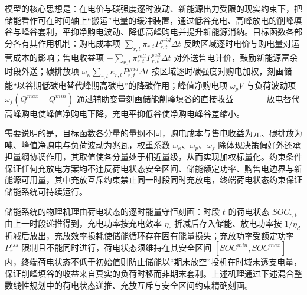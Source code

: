 \documentclass{ctexart}
\begin{document}
模型的核心思想是：在电价与碳强度逐时波动、新能源出力受限的现实约束下，把储能看作可在时间轴上“搬运”电量的缓冲装置，通过低谷充电、高峰放电的削峰填谷与峰谷套利，平抑净购电波动、降低高峰购电并提升新能源消纳。目标函数各部分各有其作用机制：购电成本项 $\sum_{r,t}\pi_{r,t}P^{grid}_{r,t}\Delta t$ 反映区域逐时电价与购电量对运营成本的影响；售电收益项 $-\sum_{r,t}\pi^{sell}_{r,t}P^{sell}_{r,t}\Delta t$ 对外送售电计价，鼓励新能源富余时段外送；碳排放项 $\omega_{\kappa}\sum_{r,t}\kappa_{r,t}P^{grid}_{r,t}\Delta t$ 按区域逐时碳强度对购电加权，刻画储能“以谷期低碳电替代峰期高碳电”的降碳作用；峰值净购电项 $\omega_p V$ 与负荷波动项 $\omega_f(Q^{max}-Q^{min})$ 通过辅助变量刻画储能削峰填谷的直接收益————放电替代高峰购电使峰值净购电下降，充电平抑低谷使净购电峰谷差缩小。

需要说明的是，目标函数各分量的量纲不同，购电成本与售电收益为元、碳排放为吨、峰值净购电与负荷波动为兆瓦，权重系数 $\omega_{\kappa}$、$\omega_p$、$\omega_f$ 除体现决策偏好外还承担量纲协调作用，其取值使各分量处于相近量级，从而实现加权标量化。约束条件保证任何充放电方案均不违反荷电状态安全区间、储能额定功率、购售电边界与新能源可用量，其中充放互斥约束禁止同一时段同时充放电，终端荷电状态约束保证储能系统可持续运行。

储能系统的物理机理由荷电状态的逐时能量守恒刻画：时段 $t$ 的荷电状态 $SOC_{r,t}$ 由上一时段递推得到，充电功率按充电效率 $\eta_c$ 折减后存入储能、放电功率按 $1/\eta_d$ 折减后放出，充放效率损耗使储能循环存在固有能量损失；充放功率受额定功率 $P^{ess}_r$ 限制且不能同时进行，荷电状态须维持在其安全区间 $[SOC^{min},SOC^{max}]$ 内，终端荷电状态不低于初始值则防止储能以“期末放空”投机在时域末透支电量，保证削峰填谷的收益来自真实的负荷时移而非期末套利。上述机理通过下述混合整数线性规划中的荷电状态递推、充放互斥与安全区间约束精确刻画。
\end{document}
